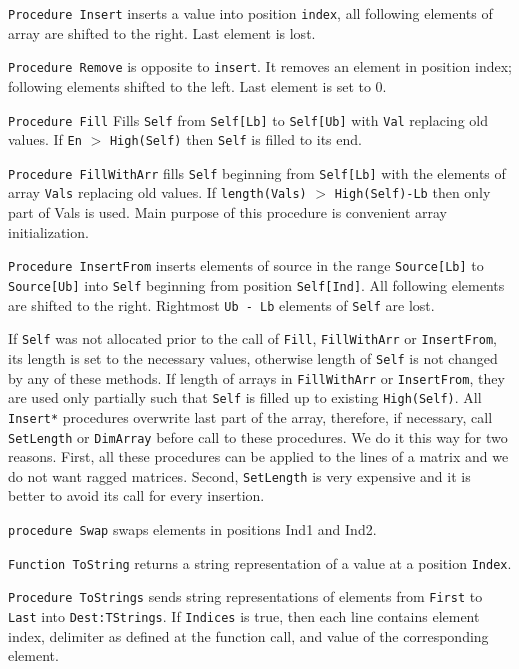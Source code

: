 \documentclass[12pt,a4paper,oneside]{article}
\newcommand{\code}[1]{\texttt{#1}}
\begin{document}
\code{Procedure Insert} inserts a value into position \code{index}, all following elements of array are shifted to the right. Last element is lost. 

\code{Procedure Remove} is opposite to \code{insert}. It removes an element in position index; following elements shifted to the left. Last element is set to 0.

\code{Procedure Fill} Fills \code{Self} from \code{Self[Lb]} to \code{Self[Ub]} with \code{Val} replacing old values. If \code{En} $>$ \code{High(Self)} then \code{Self} is filled to its end.

\code{Procedure FillWithArr} fills \code{Self} beginning from \code{Self[Lb]} with the elements of array \code{Vals} replacing old values. If \code{length(Vals)} $>$ \code{High(Self)-Lb} then only part of Vals is used. Main purpose of this procedure is convenient array initialization.

\code{Procedure InsertFrom} inserts elements of source in the range \code{Source[Lb]} to \code{Source[Ub]} into \code{Self} beginning from position \code{Self[Ind]}. All following elements are shifted to the right. Rightmost \code{Ub - Lb} elements of \code{Self} are lost.

If \code{Self} was not allocated prior to the call of \code{Fill}, \code{FillWithArr} or \code{InsertFrom}, its length is set to the necessary values, otherwise length of \code{Self} is not changed by any of these methods. If length of arrays in \code{FillWithArr} or \code{InsertFrom}, they are used only partially such that \code{Self} is filled up to existing \code{High(Self)}. All \code{Insert*} procedures overwrite last part of the array, therefore, if necessary, call \code{SetLength} or \code{DimArray} before call to these procedures. We do it this way for two reasons. First, all these procedures can be applied to the lines of a matrix and we do not want ragged matrices. Second, \code{SetLength} is very expensive and it is better to avoid its call for every insertion. 

\code{procedure Swap} swaps elements in positions Ind1 and Ind2.

\code{Function ToString} returns a string representation of a value at a position \code{Index}.

\code{Procedure ToStrings} sends string representations of elements from \code{First} to \code{Last} into \code{Dest:TStrings}. If \code{Indices} is true, then each line contains element index, delimiter as defined at the function call, and value of the corresponding element.
\end{document}
